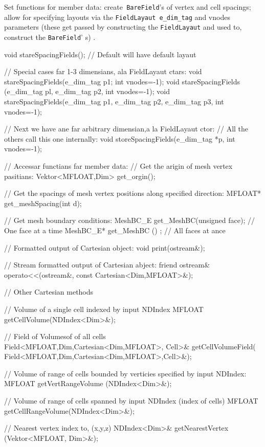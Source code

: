 Set functions for member data: create\texttt{ BareField}'s of vertex and cell spacings; allow for specifying layouts via the \texttt{FieldLayaut e\_dim\_tag} and vnodes parameters 
(these get passed by constructing  the \texttt{FieldLayaut} and used to, construct the \texttt{BareField}' s) . 

\begin{smallcode}

void stareSpacingFields(); // Default will have default layaut 

// Special cases far 1-3 dimensians, ala FieldLayaut ctars: 
void stareSpacingFields(e_dim_tag p1; int vnodes=-1); 
void stareSpacingFields (e_dim_tag pl, e_dim_tag p2, int vnodes=-1); 
void stareSpacingFields(e_dim_tag p1, e_dim_tag p2, e_dim_tag p3, int vnodes=-1); 

// Next we have ane far arbitrary dimensian,a la FieldLayaut ctor: 
// All the others call this one internally: 
void storeSpacingFields(e_dim_tag *p, int vnodes=-1);
 
// Accessar functians far member data: 
// Get the arigin of mesh vertex pasitians: 
Vektor<MFLOAT,Dim> get_orgin(); 
 
// Get the spacings of mesh vertex positions along specified direction: 
MFLOAT* get_meshSpacing(int d); 

// Get mesh boundary conditions: 
MeshBC_E get_MeshBC(unsigned face);     // One face at a time 
MeshBC_E* get_MeshBC () ; 	                        // All faces at ance

// Formatted output of Cartesian object: 
void print(ostream&); 

// Stream formatted output of Cartesian abject:
friend ostream& operato<<(ostream&, const Cartesian<Dim,MFLOAT>&);
 
  
// Other Cartesian methods
  
// Volume of a single cell indexed by input NDIndex
MFLOAT getCellVolume(NDIndex<Dim>&); 
  
// Field of Volumesof of all cells
Field<MFLOAT,Dim,Cartesian<Dim,MFLOAT>, Cell>& getCellVolumeField(
Field<MFLOAT,Dim,Cartesian<Dim,MFLOAT>,Cell>&);
   
// Volume of range of cells bounded by verticies specified by input NDIndex: 
MFLOAT getVertRangeVolume (NDIndex<Dim>&);
    
// Volume of range of cells spanned by input NDIndex (index of cells) 
MFLOAT getCellRangeVolume(NDIndex<Dim>&);
     
// Nearest vertex index to, (x,y,z)
NDIndex<Dim>& getNearestVertex (Vektor<MFLOAT, Dim>&);


\end{smallcode}
